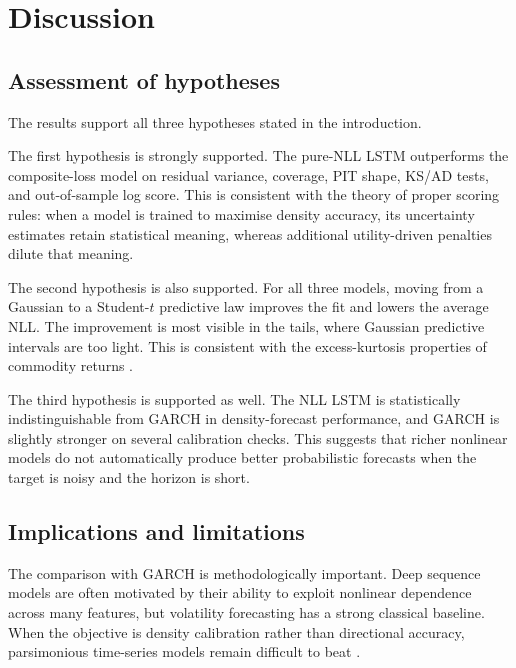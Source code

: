 \documentclass[%
 amsmath,amssymb,
 aps,
 pra,
 floatfix,
 raggedbottom,
 nofootinbib,
12pt,]{revtex4-2}
\begin{document}
\FloatBarrier

\section{Discussion}
\label{sec:discussion}

\subsection{Assessment of hypotheses}

The results support all three hypotheses stated in the introduction.

The first hypothesis is strongly supported. The pure-NLL LSTM outperforms the composite-loss model on residual variance, coverage, PIT shape, KS/AD tests, and out-of-sample log score. This is consistent with the theory of proper scoring rules: when a model is trained to maximise density accuracy, its uncertainty estimates retain statistical meaning, whereas additional utility-driven penalties dilute that meaning.

The second hypothesis is also supported. For all three models, moving from a Gaussian to a Student-$t$ predictive law improves the fit and lowers the average NLL. The improvement is most visible in the tails, where Gaussian predictive intervals are too light. This is consistent with the excess-kurtosis properties of commodity returns \citep{cont2001empirical}.

The third hypothesis is supported as well. The NLL LSTM is statistically indistinguishable from GARCH in density-forecast performance, and GARCH is slightly stronger on several calibration checks. This suggests that richer nonlinear models do not automatically produce better probabilistic forecasts when the target is noisy and the horizon is short.

\subsection{Implications and limitations}

The comparison with GARCH is methodologically important. Deep sequence models are often motivated by their ability to exploit nonlinear dependence across many features, but volatility forecasting has a strong classical baseline. When the objective is density calibration rather than directional accuracy, parsimonious time-series models remain difficult to beat \citep{hansen2005forecast}.
\end{document}
